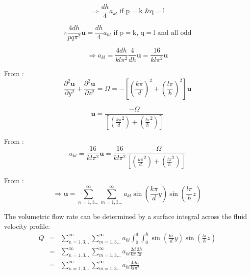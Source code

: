 \begin{equation}
 \Rightarrow \frac{dh}{4} a_{kl} \textrm{ if p} = \textrm{k \& q} = \textrm{l}
\label{eqn:16}
\end{equation}


\begin{equation}
 \therefore \frac{4dh}{pq\pi^{2}}\mathbf{u} = \frac{dh}{4} a_{kl} \textrm{ if p} = \textrm{k, q} = \textrm{l and all odd}
\label{eqn:17}
\end{equation}


\begin{equation}
 \Rightarrow  a_{kl} = \frac{4dh}{kl\pi^{2}}\frac{4}{dh}\mathbf{u} = \frac{16}{kl\pi^{2}}\mathbf{u}
\label{eqn:18}
\end{equation}

From :
\begin{equation}
 \frac{\partial^2 \mathbf{u}}{\partial y^2} + \frac{\partial^2 \mathbf{u}}{\partial z^2} = \Omega = - \left [ \left ( \frac{k\pi}{d} \right )^2 + \left ( \frac{l\pi}{h} \right )^2 \right ] \mathbf{u}
\label{eqn:19}
\end{equation}


\begin{equation}
 \mathbf{u} = \frac{-\Omega}{\left [ \left ( \frac{k\pi}{d}^2 \right ) + \left ( \frac{l\pi}{h}^2 \right ) \right ] }
\label{eqn:20}
\end{equation}

From :
\begin{equation}
 a_{kl} = \frac{16}{kl\pi^{2}}\mathbf{u} = \frac{16}{kl\pi^{2}} \frac{-\Omega}{\left [ \left ( \frac{k\pi}{d}^2 \right ) + \left ( \frac{l\pi}{h}^2 \right ) \right ] }
\label{eqn:21}
\end{equation}

From :
\begin{equation}
 \Rightarrow \mathbf{u} = \sum_{n=1,3...}^{\infty } \sum_{m=1,3...}^{\infty } a_{kl} \sin \left (\frac{k\pi}{d}y  \right ) \sin \left(\frac{l\pi}{h}z \right)
\label{eqn:22}
\end{equation}

The volumetric flow rate can be determined by a surface integral across the fluid velocity profile:
\begin{eqnarray}
Q &=& \sum_{n=1,3...}^{\infty } \sum_{m=1,3...}^{\infty } a_{kl} \int_{0}^{d} \int_{0}^{h} \sin \left (\frac{k\pi}{d}y  \right ) \sin \left(\frac{l\pi}{h}z \right) \nonumber \\ 
 &=& \sum_{n=1,3...}^{\infty } \sum_{m=1,3...}^{\infty } a_{kl} \frac{2d}{k\pi}  \frac{2h}{l\pi} \nonumber \\ 
 &=& \sum_{n=1,3...}^{\infty } \sum_{m=1,3...}^{\infty } a_{kl} \frac{4dh}{kl\pi^{2}}
\label{eqn:24}
\end{eqnarray}
